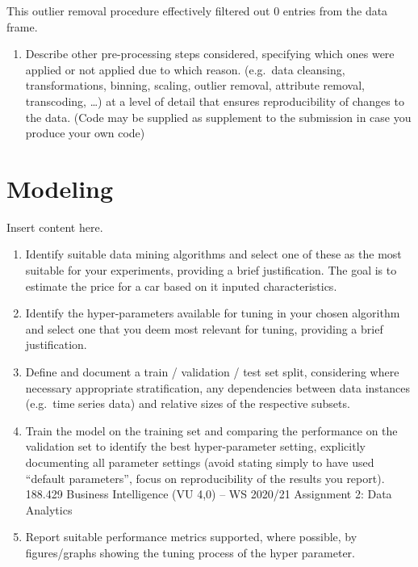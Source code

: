 \documentclass[sigchi]{acmart}
\def\tightlist{}
\begin{document}
This outlier removal procedure effectively filtered out 0 entries from the data frame.

\begin{enumerate}
\def\labelenumi{\alph{enumi}.}
\setcounter{enumi}{2}
\tightlist
\item
  Describe other pre-processing steps considered, specifying which ones were applied or not applied due to which reason. (e.g.~data cleansing, transformations, binning, scaling, outlier removal, attribute removal, transcoding, \ldots) at a level of detail that ensures reproducibility of changes to the data. (Code may be supplied as supplement to the submission in case you produce your own code)
\end{enumerate}

\hypertarget{modeling}{%
\section{Modeling}\label{modeling}}

Insert content here.

\begin{enumerate}
\def\labelenumi{\alph{enumi}.}
\item
  Identify suitable data mining algorithms and select one of these as the most suitable for your experiments, providing a brief justification.
  The goal is to estimate the price for a car based on it inputed characteristics.
\item
  Identify the hyper-parameters available for tuning in your chosen algorithm and select one that you deem most relevant for tuning, providing a brief justification.
\item
  Define and document a train / validation / test set split, considering where necessary appropriate stratification, any dependencies between data instances (e.g.~time series data) and relative sizes of the respective subsets.
\item
  Train the model on the training set and comparing the performance on the validation set to identify the best hyper-parameter setting, explicitly documenting all parameter settings (avoid stating simply to have used ``default parameters'', focus on reproducibility of the results you report).
  188.429 Business Intelligence (VU 4,0) -- WS 2020/21 Assignment 2: Data Analytics
\item
  Report suitable performance metrics supported, where possible, by figures/graphs showing the tuning process of the hyper parameter.
\end{enumerate}
\end{document}
